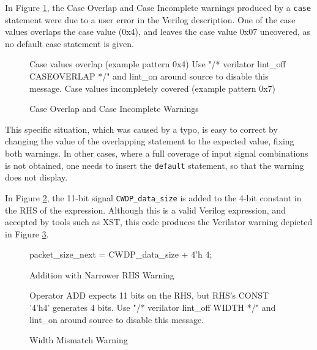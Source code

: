 \documentclass[defaultstyle,10pt,master,Helvetica]{thesis}
\begin{document}
In Figure \ref{fig:casewarn}, the Case Overlap and Case Incomplete warnings produced by a {\tt case} statement were due to a user error in the Verilog description. One of the case values overlaps the case value (0x4), and leaves the case value 0x07 uncovered, as no default case statement is given.

\begin{figure}[h]
\begin{boxedverbatim}
Case values overlap (example pattern 0x4)
Use "/* verilator lint_off CASEOVERLAP */" and lint_on around source to disable this message.
Case values incompletely covered (example pattern 0x7)
\end{boxedverbatim}
\caption{Case Overlap and Case Incomplete Warnings}
\label{fig:casewarn}
\end{figure}

This specific situation, which was caused by a typo, is easy to correct by changing the value of the overlapping statement to the expected value, fixing both warnings. In other cases, where a full coverage of input signal combinations is not obtained, one needs to insert the {\tt default} statement, so that the warning does not display.
\vspace{0.5cm}

In Figure \ref{fig:addsmallerrightside}, the 11-bit signal {\tt CWDP\_data\_size} is added to the 4-bit constant in the \ac{RHS} of the expression. Although this is a valid Verilog expression, and accepted by tools such as \ac{XST}, this code produces the Verilator warning depicted in Figure \ref{fig:casewidth}.

\begin{figure}[h]
\begin{boxedverbatim}
packet_size_next = CWDP_data_size + 4'h 4;
\end{boxedverbatim}
\caption{Addition with Narrower \acs{RHS} Warning}
\label{fig:addsmallerrightside}
\end{figure}

\begin{figure}[h]
\begin{boxedverbatim}
Operator ADD expects 11 bits on the RHS, but RHS's CONST '4'h4' generates 4 bits.
Use "/* verilator lint_off WIDTH */" and lint_on around source to disable this message.
\end{boxedverbatim}
\caption{Width Mismatch Warning}
\label{fig:casewidth}
\end{figure}
\end{document}
